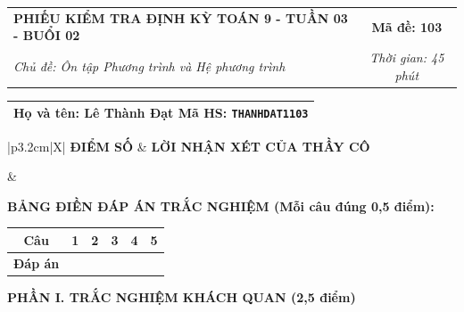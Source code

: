 \documentclass[12pt,a4paper]{article}
\begin{document}
\newpage


\noindent
\begin{tabularx}{\linewidth}{|X|c|}
\hline
\textbf{PHIẾU KIỂM TRA ĐỊNH KỲ TOÁN 9 - TUẦN 03 - BUỔI 02} & \textbf{Mã đề: 103} \\
\textit{Chủ đề: Ôn tập Phương trình và Hệ phương trình} & \textit{Thời gian: 45 phút} \\
\hline
\end{tabularx}

\vspace{1mm}

\noindent
\begin{tabularx}{\linewidth}{|X|}
\hline
\rule[-2mm]{0pt}{7.5mm}\textbf{Họ và tên:} \textbf{\large Lê Thành Đạt} \hfill \textbf{Mã HS:} \texttt{THANHDAT1103} \quad \\
\hline
\end{tabularx}

\vspace{1mm}

\noindent
\begin{tabularx}{\linewidth}{|p{3.2cm}|X|}
\hline
\centering\textbf{ĐIỂM SỐ} & \centering\textbf{LỜI NHẬN XÉT CỦA THẦY CÔ} \tabularnewline
\hline
\rule{0pt}{1.3cm} & \tabularnewline
\hline
\end{tabularx}

\vspace{1.2mm}

\noindent\textbf{BẢNG ĐIỀN ĐÁP ÁN TRẮC NGHIỆM (Mỗi câu đúng 0,5 điểm):}
\vspace{0.8mm}

\noindent
\renewcommand{\arraystretch}{1.35}
\begin{tabularx}{\linewidth}{|c|*{5}{>{\centering\arraybackslash}X|}}
\hline
\textbf{Câu} & \textbf{1} & \textbf{2} & \textbf{3} & \textbf{4} & \textbf{5} \\
\hline
\textbf{Đáp án} & & & & & \\
\hline
\end{tabularx}
\renewcommand{\arraystretch}{1.0}

\vspace{1.5mm}

\noindent\textbf{\large PHẦN I. TRẮC NGHIỆM KHÁCH QUAN (2,5 điểm)}
\vspace{1mm}
\end{document}
